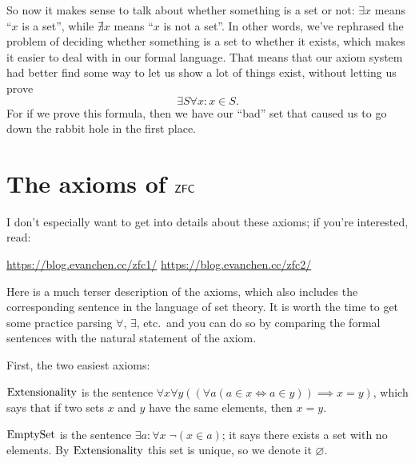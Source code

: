 So now it makes sense to talk about whether something is a set or not:
$\exists x$ means ``$x$ is a set'', while $\nexists x$ means ``$x$ is not a set''.
In other words, we've rephrased the problem of deciding whether something
is a set to whether it exists,
which makes it easier to deal with in our formal language.
That means that our axiom system had better find some way to let us
show a lot of things exist, without letting us prove
\[ \exists S \forall x : x \in S. \]
For if we prove this formula,
then we have our ``bad'' set that caused us to go down the
rabbit hole in the first place.

\section{The axioms of $\mathsf{ZFC}$}
I don't especially want to get into details about these axioms;
if you're interested, read:
\begin{itemize}
	\ii \footnotesize \url{https://blog.evanchen.cc/zfc1/}
	\ii \footnotesize \url{https://blog.evanchen.cc/zfc2/}
\end{itemize}
Here is a much terser description of the axioms,
which also includes the corresponding sentence in the language of set theory.
It is worth the time to get some practice parsing $\forall$, $\exists$, etc.\
and you can do so by comparing the formal sentences with the natural statement of the axiom.

First, the two easiest axioms:
\begin{itemize}
	\ii $\mathrm{Extensionality}$ is the sentence
	$\forall x \forall y
	\left( \left( \forall a  \left( a \in x \iff a \in y \right) \right)
	\implies x = y \right)$,
	which says that if two sets $x$ and $y$ have the same elements,
	then $x = y$.

	\ii $\mathrm{EmptySet}$ is the sentence $\exists a : \forall x \; \neg (x \in a)$;
	it says there exists a set with no elements.
	By $\mathrm{Extensionality}$ this set is unique, so we denote it $\varnothing$.
\end{itemize}

